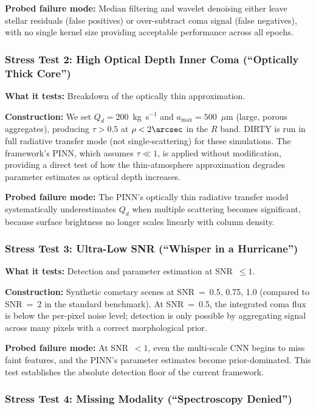 \documentclass[usenatbib]{mnras}
\begin{document}
\textbf{Probed failure mode:} Median filtering and wavelet denoising either leave stellar residuals (false positives) or over-subtract coma signal (false negatives), with no single kernel size providing acceptable performance across all epochs.

\subsubsection{Stress Test 2: High Optical Depth Inner Coma (``Optically Thick Core'')}

\textbf{What it tests:} Breakdown of the optically thin approximation.

\textbf{Construction:} We set $Q_d = 200$~kg~s$^{-1}$ and $a_{\max} = 500$~$\mu$m (large, porous aggregates), producing $\tau > 0.5$ at $\rho < 2\arcsec$ in the $R$ band. DIRTY is run in full radiative transfer mode (not single-scattering) for these simulations. The framework's PINN, which assumes $\tau \ll 1$, is applied without modification, providing a direct test of how the thin-atmosphere approximation degrades parameter estimates as optical depth increases.

\textbf{Probed failure mode:} The PINN's optically thin radiative transfer model systematically underestimates $Q_d$ when multiple scattering becomes significant, because surface brightness no longer scales linearly with column density.

\subsubsection{Stress Test 3: Ultra-Low SNR (``Whisper in a Hurricane'')}

\textbf{What it tests:} Detection and parameter estimation at SNR~$\leq 1$.

\textbf{Construction:} Synthetic cometary scenes at SNR~=~0.5, 0.75, 1.0 (compared to SNR~=~2 in the standard benchmark). At SNR~=~0.5, the integrated coma flux is below the per-pixel noise level; detection is only possible by aggregating signal across many pixels with a correct morphological prior.

\textbf{Probed failure mode:} At SNR~$<1$, even the multi-scale CNN begins to miss faint features, and the PINN's parameter estimates become prior-dominated. This test establishes the absolute detection floor of the current framework.

\subsubsection{Stress Test 4: Missing Modality (``Spectroscopy Denied'')}
\end{document}
